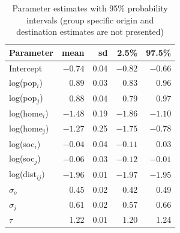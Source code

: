 \documentclass[fleqn,10pt]{SelfArx} %
\begin{document}
{{%
\begin{table}[ht]
  \centering
  \caption{Parameter estimates with 95\% probability intervals (group specific origin and destination estimates are not presented)}
  \label{tab:coef}
  \begin{tabular}{lrrrr}
    \toprule
    Parameter & mean & sd & 2.5\% & 97.5\% \\ 
    \midrule
    Intercept      & $-0.74$ & 0.04 & $-0.82$ & $-0.66$ \\ 
    log(pop$_i$)   & 0.89 & 0.03 & 0.83 & 0.96 \\ 
    log(pop$_j$)   & 0.88 & 0.04 & 0.79 & 0.97 \\ 
    log(home$_i$)  & $-1.48$ & 0.19 & $-1.86$ & $-1.10$ \\ 
    log(home$_j$)  & $-1.27$ & 0.25 & $-1.75$ & $-0.78$ \\ 
    log(soc$_i$)   & $-0.04$ & 0.04 & $-0.11$ & 0.03 \\
    log(soc$_j$)   & $-0.06$ & 0.03 & $-0.12$ & $-0.01$ \\ 
    log(dist$_{ij})$ & $-1.96$ & 0.01 & $-1.97$ & $-1.95$ \\ 
    $\sigma_o$    & 0.45 & 0.02 & 0.42 & 0.49 \\ 
    $\sigma_j$    & 0.61 & 0.02 & 0.57 & 0.66 \\ 
    $\tau$        & 1.22 & 0.01 & 1.20 & 1.24 \\ 
    \bottomrule
  \end{tabular}
\end{table}

}}
\end{document}
